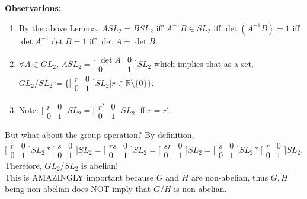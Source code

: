 \documentclass{article}
\newcommand{\R}{\mathbb{R}}
\newcommand{\coleq}{\coloneqq}
\newcommand{\inverse}[1]{#1^{-1}}
\newcommand{\define}[1]{\textbf{\underline{#1}}}
\theoremstyle{definition}
\theoremstyle{remark}
\begin{document}
{{            \define{Observations:}\hfill
            \begin{enumerate}
                \item By the above Lemma, $ASL_2=BSL_2$ iff $\inverse{A}B\in SL_2$ iff $\det(\inverse{A}B)=1$ iff $\det\inverse{A}\det B=1$ iff $\det A=\det B$.
                \item $\forall A\in GL_2, \, ASL_2=\big[\begin{smallmatrix} \det A & 0\\ 0 & 1 \end{smallmatrix}\big]SL_2$ which implies that as a set, $GL_2/SL_2 \coleq \Big\{\big[\begin{smallmatrix} r & 0\\ 0 & 1 \end{smallmatrix}\big]SL_2| r\in \R\setminus\{0\}\Big\}$.
                \item Note: $\big[\begin{smallmatrix} r & 0\\ 0 & 1 \end{smallmatrix}\big]SL_2=\big[\begin{smallmatrix} r' & 0\\ 0 & 1 \end{smallmatrix}\big]SL_2$ iff $r=r'$.
            \end{enumerate}
            
            \noindent But what about the group operation? By definition,\\$\big[\begin{smallmatrix} r & 0\\ 0 & 1 \end{smallmatrix}\big]SL_2*\big[\begin{smallmatrix} s & 0\\ 0 & 1 \end{smallmatrix}\big]SL_2=\big[\begin{smallmatrix} rs & 0\\ 0 & 1 \end{smallmatrix}\big]SL_2=\big[\begin{smallmatrix} sr & 0\\ 0 & 1 \end{smallmatrix}\big]SL_2=\big[\begin{smallmatrix} s & 0\\ 0 & 1 \end{smallmatrix}\big]SL_2*\big[\begin{smallmatrix} r & 0\\ 0 & 1 \end{smallmatrix}\big]SL_2$. Therefore, $GL_2/SL_2$ is abelian!\\
            This is AMAZINGLY important because $G$ and $H$ are non-abelian, thus $G,H$ being non-abelian does NOT imply that $G/H$ is non-abelian.\\
    
}}
\end{document}
